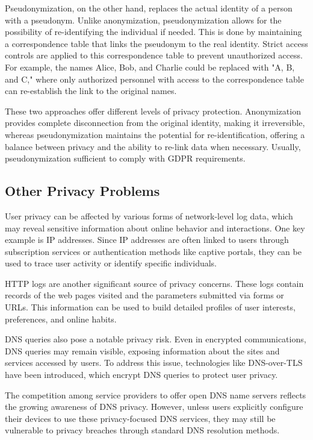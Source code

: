 Pseudonymization, on the other hand, replaces the actual identity of a
person with a pseudonym. Unlike anonymization, pseudonymization allows
for the possibility of re-identifying the individual if needed. This
is done by maintaining a correspondence table that links the pseudonym
to the real identity. Strict access controls are applied to this
correspondence table to prevent unauthorized access. For example, the
names Alice, Bob, and Charlie could be replaced with "A, B, and C,"
where only authorized personnel with access to the correspondence
table can re-establish the link to the original names.

These two approaches offer different levels of privacy protection.
Anonymization provides complete disconnection from the original
identity, making it irreversible, whereas pseudonymization maintains
the potential for re-identification, offering a balance between
privacy and the ability to re-link data when necessary. Usually,
pseudonymization sufficient to comply with GDPR requirements.

\subsection{Other Privacy Problems}

User privacy can be affected by various forms of network-level log
data, which may reveal sensitive information about online behavior and
interactions. One key example is IP addresses. Since IP addresses are
often linked to users through subscription services or authentication
methods like captive portals, they can be used to trace user activity
or identify specific individuals.

HTTP logs are another significant source of privacy concerns. These
logs contain records of the web pages visited and the parameters
submitted via forms or URLs. This information can be used to build
detailed profiles of user interests, preferences, and online habits.

DNS queries also pose a notable privacy risk. Even in encrypted
communications, DNS queries may remain visible, exposing information
about the sites and services accessed by users. To address this issue,
technologies like DNS-over-TLS have been introduced, which encrypt DNS
queries to protect user privacy. 

The competition among service providers to offer open DNS name servers
reflects the growing awareness of DNS privacy. However, unless users
explicitly configure their devices to use these privacy-focused DNS
services, they may still be vulnerable to privacy breaches through
standard DNS resolution methods.

